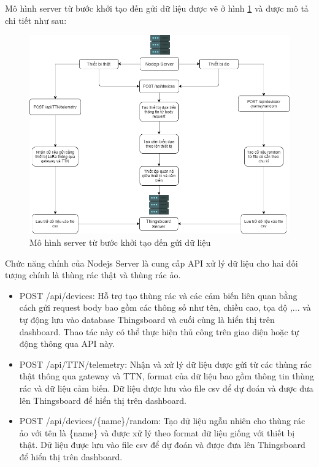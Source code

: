 Mô hình server từ bước khởi tạo đến gửi dữ liệu được vẽ ở hình \ref{fig:chart_server1} và được mô tả chi tiết như sau:
\begin{figure}[H]
    \centering
    \includegraphics[width=\textwidth]{images/Khanh/Nodejs/Chart_server1.png}
    \caption{Mô hình server từ bước khởi tạo đến gửi dữ liệu}
    \label{fig:chart_server1}
\end{figure}

Chức năng chính của Nodejs Server là cung cấp API xử lý dữ liệu cho hai đối tượng chính là thùng rác thật và thùng rác ảo.
\begin{itemize}
    \item POST /api/devices: Hỗ trợ tạo thùng rác và các cảm biến liên quan bằng cách gửi request body bao gồm các thông số như tên, chiều cao, tọa độ ,... và tự động lưu vào database Thingsboard và cuối cùng là hiển thị trên dashboard. Thao tác này có thể thực hiện thủ công trên giao diện hoặc tự động thông qua API này.
    \item POST /api/TTN/telemetry: Nhận và xử lý dữ liệu được gửi từ các thùng rác thật thông qua gateway và TTN, format của dữ liệu bao gồm thông tin thùng rác và dữ liệu cảm biến. Dữ liệu được lưu vào file csv để dự đoán và được đưa lên Thingsboard để hiển thị trên dashboard.
    \item POST /api/devices/\{name\}/random: Tạo dữ liệu ngẫu nhiên cho thùng rác ảo với tên là \{name\} và được xử lý theo format dữ liệu giống với thiết bị thật. Dữ liệu được lưu vào file csv để dự đoán và được đưa lên Thingsboard để hiển thị trên dashboard.
\end{itemize}

